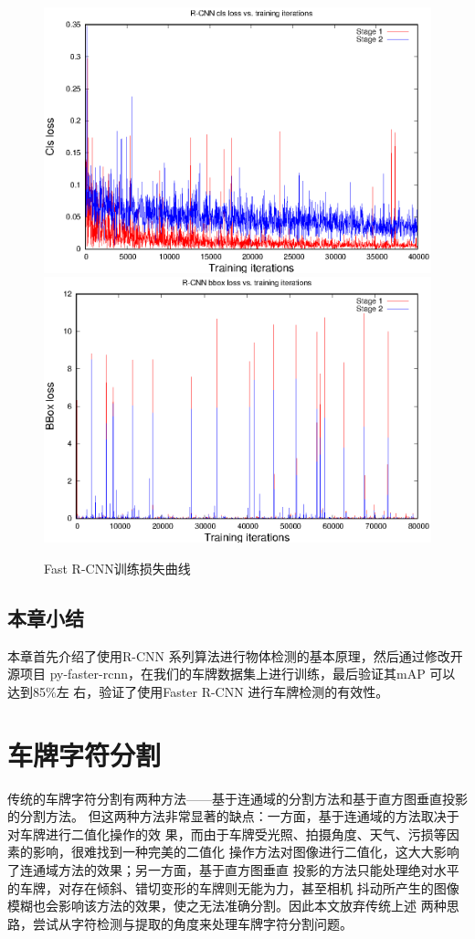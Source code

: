 \begin{figure}[ht]
\centering
{}
{\includegraphics[width=0.8\linewidth]{./Figure/RCNNClsLoss.eps}}
{\includegraphics[width=0.8\linewidth]{./Figure/RCNNBBoxLoss.eps}}
\caption{Fast R-CNN训练损失曲线}
\end{figure}

\section{本章小结}

本章首先介绍了使用R-CNN 系列算法进行物体检测的基本原理，然后通过修改开源项目
py-faster-rcnn，在我们的车牌数据集上进行训练，最后验证其mAP 可以达到85\%左
右，验证了使用Faster R-CNN 进行车牌检测的有效性。

\chapter{车牌字符分割}

传统的车牌字符分割有两种方法——基于连通域的分割方法和基于直方图垂直投影的分割方法。
但这两种方法非常显著的缺点：一方面，基于连通域的方法取决于对车牌进行二值化操作的效
果，而由于车牌受光照、拍摄角度、天气、污损等因素的影响，很难找到一种完美的二值化
操作方法对图像进行二值化，这大大影响了连通域方法的效果；另一方面，基于直方图垂直
投影的方法只能处理绝对水平的车牌，对存在倾斜、错切变形的车牌则无能为力，甚至相机
抖动所产生的图像模糊也会影响该方法的效果，使之无法准确分割。因此本文放弃传统上述
两种思路，尝试从字符检测与提取的角度来处理车牌字符分割问题。

